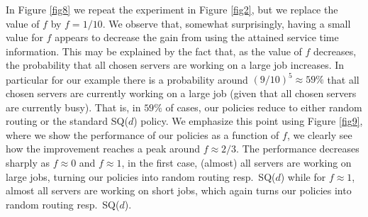 \documentclass[12pt]{report}
\begin{document}
In Figure \ref{fig8} we repeat the experiment in Figure \ref{fig2}, but we replace the value of $f$ by $f=1/10$. We observe that, somewhat surprisingly, having a small value for $f$ appears to decrease the gain from using the attained service time information. This may be explained by the fact that, as the value of $f$ decreases, the probability that all chosen servers are working on a large job increases. In particular for our example there is a probability around $(9/10)^5 \approx 59\%$ that all chosen servers are currently working on a large job (given that all chosen servers are currently busy). That is, in $59\%$ of cases, our policies reduce to either random routing or the standard SQ($d$) policy. We emphasize this point using Figure \ref{fig9}, where we show the performance of our policies as a function of $f$, we clearly see how the improvement reaches a peak around $f \approx 2/3$. The performance decreases sharply as $f\approx 0$ and $f \approx 1$, in the first case, (almost) all servers are working on large jobs, turning our policies into random routing resp.~SQ($d$) while for $f\approx 1$, almost all servers are working on short jobs, which again turns our policies into random routing resp.~SQ($d$).
\end{document}

